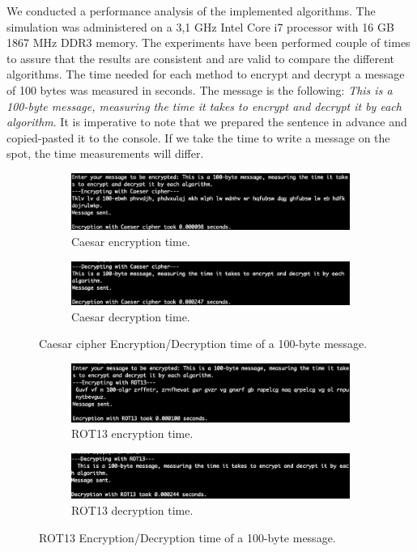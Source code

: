 We conducted a performance analysis of the implemented algorithms. The simulation was administered on a 3,1 GHz Intel Core i7 processor with 16 GB 1867 MHz DDR3 memory. The experiments have been performed couple of times to assure that the results are consistent and are valid to compare the different algorithms. The time needed for each method to encrypt and decrypt a message of 100 bytes was measured in seconds. The message is the following: \textit{This is a 100-byte message, measuring the time it takes to encrypt and decrypt it by each algorithm}. It is imperative to note that we prepared the sentence in advance and copied-pasted it to the console. If we take the time to write a message on the spot, the time measurements will differ. 

\begin{figure}[h!]
  \centering
  \begin{subfigure}[b]{1.0\linewidth}
    \includegraphics[width=\linewidth]{caesarencrypt.jpg}
    \caption{Caesar encryption time.}
  \end{subfigure}
  \begin{subfigure}[b]{1.0\linewidth}
    \includegraphics[width=\linewidth]{caesardecrypt.jpg}
    \caption{Caesar decryption time.}
  \end{subfigure}
  \caption{Caesar cipher Encryption/Decryption time of a 100-byte message.}
  \label{fig:caesar}
\end{figure}

\begin{figure}[h!]
  \centering
  \begin{subfigure}[b]{1.0\linewidth}
    \includegraphics[width=\linewidth]{rot13encrypt.jpg}
    \caption{ROT13 encryption time.}
  \end{subfigure}
  \begin{subfigure}[b]{1.0\linewidth}
    \includegraphics[width=\linewidth]{rot13decrypt.jpg}
    \caption{ROT13 decryption time.}
  \end{subfigure}
  \caption{ROT13 Encryption/Decryption time of a 100-byte message.}
  \label{fig:rot13}
\end{figure}

